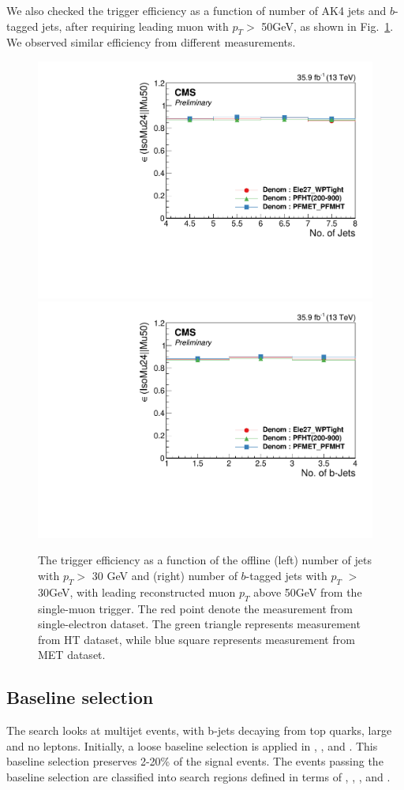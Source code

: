 We also checked the trigger efficiency as a function of number of AK4 jets and
$b$-tagged jets, after requiring leading muon with $p_{T}>$ 50GeV, as shown in
Fig.~\ref{fig:TrigMuonJets}. We observed similar efficiency from different
measurements.
\begin{figure}[tbp]
 \begin{center}
   \includegraphics[width=0.49\linewidth]{sections/mc4/EvtSelSBOpt/figures/MuonNJets.pdf}
   \includegraphics[width=0.49\linewidth]{sections/mc4/EvtSelSBOpt/figures/MuonNBs.pdf}
   \caption{ The trigger efficiency as a function of the offline (left) number
		 of jets with $p_{T}>$ 30 GeV and (right) number of $b$-tagged jets with $p_{T}$
		 $>$ 30GeV, with leading reconstructed muon $p_{T}$ above 50GeV from the
   single-muon trigger. The red point denote the measurement from
   single-electron dataset. The green triangle represents measurement from HT
   dataset, while blue square represents measurement from MET dataset.}
   \label{fig:TrigMuonJets}
 \end{center}
\end{figure}

\subsection{Baseline selection}
\label{sec:baselineselection}

The search looks at multijet events, with b-jets decaying from top quarks, 
large \MET and no leptons. Initially, a loose baseline selection is applied 
in \MET, \HT, \njets and \nbjets. %
This baseline selection preserves 2-20\% of the signal events. 
The events passing the baseline selection are classified into search regions
defined in terms of \ntops, \nbjets, \MET, \HT and \MTTwo.

